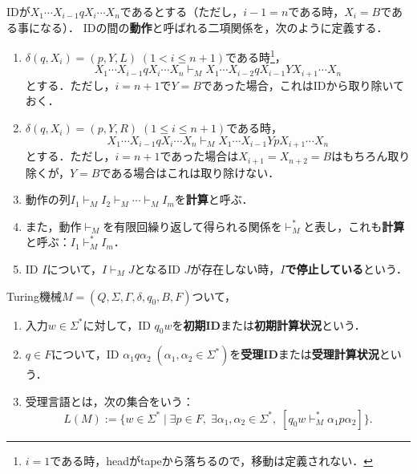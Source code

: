 \begin{definition}
    IDが$X_1\cdots X_{i-1}qX_{i}\cdots X_n$であるとする（ただし，$i-1=n$である時，$X_i=B$である事になる）．
    IDの間の\textbf{動作}と呼ばれる二項関係を，次のように定義する．
    \begin{enumerate}
        \item $\delta(q,X_i)=(p,Y,L)\;(1<i\le n+1)$である時\footnote{$i=1$である時，headがtapeから落ちるので，移動は定義されない．}，
        \[X_1\cdots X_{i-1}qX_i\cdots X_n\vdash_MX_1\cdots X_{i-2}qX_{i-1}YX_{i+1}\cdots X_n\]
        とする．ただし，$i=n+1$で$Y=B$であった場合，これはIDから取り除いておく．
        \item $\delta(q,X_i)=(p,Y,R)\;(1\le i\le n+1)$である時，
        \[X_1\cdots X_{i-1}qX_i\cdots X_n\vdash_MX_1\cdots X_{i-1}YpX_{i+1}\cdots X_n\]
        とする．ただし，$i=n+1$であった場合は$X_{i+1}=X_{n+2}=B$はもちろん取り除くが，$Y=B$である場合はこれは取り除けない．
        \item 動作の列$I_1\vdash_MI_2\vdash_M\cdots\vdash_MI_m$を\textbf{計算}と呼ぶ．
        \item また，動作$\vdash_M$を有限回繰り返して得られる関係を$\vdash_M^*$と表し，これも\textbf{計算}と呼ぶ：$I_1\vdash^*_MI_m$．
        \item ID $I$について，$I\vdash_MJ$となるID $J$が存在しない時，\textbf{$I$で停止している}という．
    \end{enumerate}
\end{definition}

\begin{definition}
    Turing機械$M=(Q,\Sigma,\Gamma,\delta,q_0,B,F)$ついて，
    \begin{enumerate}
        \item 入力$w\in\Sigma^*$に対して，ID $q_0w$を\textbf{初期ID}または\textbf{初期計算状況}という．
        \item $q\in F$について，ID $\alpha_1q\alpha_2\;(\alpha_1,\alpha_2\in\Sigma^*)$を\textbf{受理ID}または\textbf{受理計算状況}という．
        \item 受理言語とは，次の集合をいう：\[L(M):=\{w\in\Sigma^*\mid \exists p\in F,\;\exists\alpha_1,\alpha_2\in\Sigma^*,\;[q_0w\vdash^*_M\alpha_1p\alpha_2]\}.\]
    \end{enumerate}
\end{definition}

